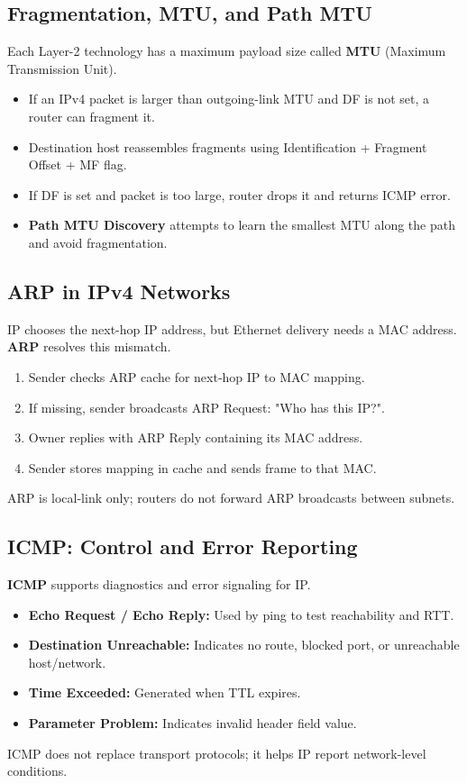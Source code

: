\documentclass[12pt,a4paper]{article}
\begin{document}
\subsection*{Fragmentation, MTU, and Path MTU}
Each Layer-2 technology has a maximum payload size called \textbf{MTU} (Maximum Transmission Unit).
\begin{itemize}
    \item If an IPv4 packet is larger than outgoing-link MTU and DF is not set, a router can fragment it.
    \item Destination host reassembles fragments using Identification + Fragment Offset + MF flag.
    \item If DF is set and packet is too large, router drops it and returns ICMP error.
    \item \textbf{Path MTU Discovery} attempts to learn the smallest MTU along the path and avoid fragmentation.
\end{itemize}

\subsection*{ARP in IPv4 Networks}
IP chooses the next-hop IP address, but Ethernet delivery needs a MAC address. \textbf{ARP} resolves this mismatch.
\begin{enumerate}
    \item Sender checks ARP cache for next-hop IP to MAC mapping.
    \item If missing, sender broadcasts ARP Request: "Who has this IP?".
    \item Owner replies with ARP Reply containing its MAC address.
    \item Sender stores mapping in cache and sends frame to that MAC.
\end{enumerate}
ARP is local-link only; routers do not forward ARP broadcasts between subnets.

\subsection*{ICMP: Control and Error Reporting}
\textbf{ICMP} supports diagnostics and error signaling for IP.
\begin{itemize}
    \item \textbf{Echo Request / Echo Reply:} Used by ping to test reachability and RTT.
    \item \textbf{Destination Unreachable:} Indicates no route, blocked port, or unreachable host/network.
    \item \textbf{Time Exceeded:} Generated when TTL expires.
    \item \textbf{Parameter Problem:} Indicates invalid header field value.
\end{itemize}
ICMP does not replace transport protocols; it helps IP report network-level conditions.
\end{document}
